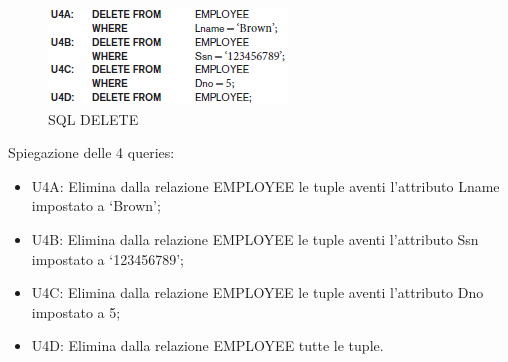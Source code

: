 \begin{itemize}
\begin{center}
\begin{figure}[H]
\centering
\includegraphics[scale=1]{figures/delete.png}
\caption{SQL DELETE} 
\end{figure}
\end{center}

Spiegazione delle 4 queries:

\begin{itemize}

\item{U4A}: Elimina dalla relazione EMPLOYEE le tuple aventi l’attributo Lname impostato a ‘Brown’;
\item{U4B}: Elimina dalla relazione EMPLOYEE le tuple aventi l’attributo Ssn impostato a ‘123456789’;
\item{U4C}: Elimina dalla relazione EMPLOYEE le tuple aventi l’attributo Dno impostato a 5;
\item{U4D}: Elimina dalla relazione EMPLOYEE tutte le tuple.

\end{itemize}


\end{itemize}
